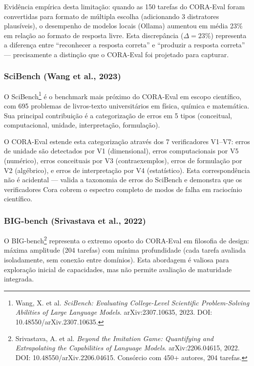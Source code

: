 Evidência empírica desta limitação: quando as 150 tarefas do CORA-Eval foram
convertidas para formato de múltipla escolha (adicionando 3 distratores
plausíveis), o desempenho de modelos locais (Ollama) aumentou em média 23\%
em relação ao formato de resposta livre. Esta discrepância ($\Delta = 23\%$)
representa a diferença entre ``reconhecer a resposta correta'' e ``produzir
a resposta correta'' --- precisamente a distinção que o CORA-Eval foi projetado
para capturar.

\subsubsection{SciBench (Wang et al., 2023)}

O SciBench\footnote{Wang, X. et al. \textit{SciBench: Evaluating College-Level
Scientific Problem-Solving Abilities of Large Language Models}. arXiv:2307.10635,
2023. DOI: 10.48550/arXiv.2307.10635.} é o benchmark mais próximo do CORA-Eval
em escopo científico, com 695 problemas de livros-texto universitários em
física, química e matemática. Sua principal contribuição é a categorização
de erros em 5 tipos (conceitual, computacional, unidade, interpretação,
formulação).

O CORA-Eval estende esta categorização através dos 7 verificadores V1--V7:
erros de unidade são detectados por V1 (dimensional), erros computacionais
por V5 (numérico), erros conceituais por V3 (contraexemplos), erros de
formulação por V2 (algébrico), e erros de interpretação por V4 (estatístico).
Esta correspondência não é acidental --- valida a taxonomia de erros do
SciBench e demonstra que os verificadores Cora cobrem o espectro completo
de modos de falha em raciocínio científico.

\subsubsection{BIG-bench (Srivastava et al., 2022)}

O BIG-bench\footnote{Srivastava, A. et al. \textit{Beyond the Imitation Game:
Quantifying and Extrapolating the Capabilities of Language Models}.
arXiv:2206.04615, 2022. DOI: 10.48550/arXiv.2206.04615. Consórcio com 450+
autores, 204 tarefas.} representa o extremo oposto do CORA-Eval em filosofia
de design: máxima amplitude (204 tarefas) com mínima profundidade (cada tarefa
avaliada isoladamente, sem conexão entre domínios). Esta abordagem é valiosa
para exploração inicial de capacidades, mas não permite avaliação de
maturidade integrada.

